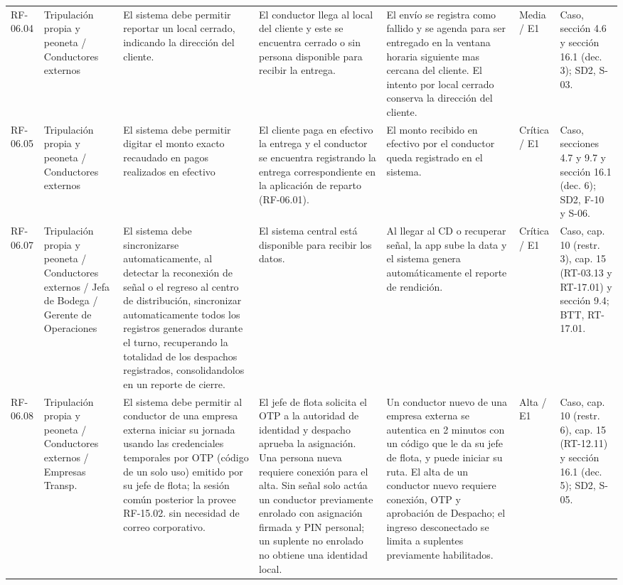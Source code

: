 {\begin{longtable}{@{}F{0.062} F{0.080} F{0.195} F{0.160} F{0.240} F{0.093} F{0.170}@{}}
  RF-06.04 & Tripulación propia y peoneta / Conductores externos & El sistema debe permitir reportar un local cerrado, indicando la dirección del cliente. & El conductor llega al local del cliente y este se encuentra cerrado o sin persona disponible para recibir la entrega. & El envío se registra como fallido y se agenda para ser entregado en la ventana horaria siguiente mas cercana del cliente. El intento por local cerrado conserva la dirección del cliente. & Media / E1 & Caso, sección 4.6 y sección 16.1 (dec. 3); SD2, S-03. \\
  RF-06.05 & Tripulación propia y peoneta / Conductores externos & El sistema debe permitir digitar el monto exacto recaudado en pagos realizados en efectivo & El cliente paga en efectivo la entrega y el conductor se encuentra registrando la entrega correspondiente en la aplicación de reparto (RF-06.01). & El monto recibido en efectivo por el conductor queda registrado en el sistema. & Crítica / E1 & Caso, secciones 4.7 y 9.7 y sección 16.1 (dec. 6); SD2, F-10 y S-06. \\
  RF-06.07 & Tripulación propia y peoneta / Conductores externos / Jefa de Bodega / Gerente de Operaciones & El sistema debe sincronizarse automaticamente, al detectar la reconexión de señal o el regreso al centro de distribución, sincronizar automaticamente todos los registros generados durante el turno, recuperando la totalidad de los despachos registrados, consolidandolos en un reporte de cierre. & El sistema central está disponible para recibir los datos. & Al llegar al CD o recuperar señal, la app sube la data y el sistema genera automáticamente el reporte de rendición. & Crítica / E1 & Caso, cap. 10 (restr. 3), cap. 15 (RT-03.13 y RT-17.01) y sección 9.4; BTT, RT-17.01. \\
  RF-06.08 & Tripulación propia y peoneta / Conductores externos / Empresas Transp. & El sistema debe permitir al conductor de una empresa externa iniciar su jornada usando las credenciales temporales por OTP (código de un solo uso) emitido por su jefe de flota; la sesión común posterior la provee RF-15.02. sin necesidad de correo corporativo. & El jefe de flota solicita el OTP a la autoridad de identidad y despacho aprueba la asignación. Una persona nueva requiere conexión para el alta. Sin señal solo actúa un conductor previamente enrolado con asignación firmada y PIN personal; un suplente no enrolado no obtiene una identidad local. & Un conductor nuevo de una empresa externa se autentica en 2 minutos con un código que le da su jefe de flota, y puede iniciar su ruta. El alta de un conductor nuevo requiere conexión, OTP y aprobación de Despacho; el ingreso desconectado se limita a suplentes previamente habilitados. & Alta / E1 & Caso, cap. 10 (restr. 6), cap. 15 (RT-12.11) y sección 16.1 (dec. 5); SD2, S-05. \\

\end{longtable}}
